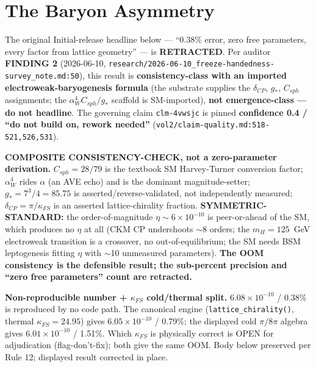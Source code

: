 \section{The Baryon Asymmetry}
\label{sec:baryon_asymmetry}

\begin{warningbox}
\footnotesize
The original Initial-release headline below --- ``0.38\% error, zero free
parameters, every factor from lattice geometry'' --- is \textbf{RETRACTED}.
Per auditor \textbf{FINDING 2} (2026-06-10,
\texttt{research/2026-06-10\_freeze-handedness-survey\_note.md:50}), this
result is \textbf{consistency-class with an imported electroweak-baryogenesis
formula} (the substrate supplies the $\delta_{CP}$, $g_*$, $C_{sph}$
assignments; the $\alpha_W^4 C_{sph}/g_*$ scaffold is SM-imported),
\textbf{not emergence-class --- do not headline}. The governing claim
\texttt{clm-4vwsjc} is pinned \textbf{confidence 0.4 / ``do not build on,
rework needed''} (\texttt{vol2/claim-quality.md:518-521,526,531}).
\par\smallskip
\textbf{COMPOSITE CONSISTENCY-CHECK, not a zero-parameter derivation.}
$C_{sph} = 28/79$ is the textbook SM Harvey-Turner conversion factor;
$\alpha_W^4$ rides $\alpha$ (an AVE echo) and is the dominant
magnitude-setter; $g_* = 7^3/4 = 85.75$ is asserted/reverse-validated, not
independently measured; $\delta_{CP} = \pi/\kappa_{FS}$ is an asserted
lattice-chirality fraction. \textbf{SYMMETRIC-STANDARD:} the
order-of-magnitude $\eta \sim 6 \times 10^{-10}$ is peer-or-ahead of the SM,
which produces no $\eta$ at all (CKM CP undershoots $\sim$8 orders; the
$m_H = 125$~GeV electroweak transition is a crossover, no out-of-equilibrium;
the SM needs BSM leptogenesis fitting $\eta$ with $\sim$10 unmeasured
parameters). \textbf{The OOM consistency is the defensible result; the
sub-percent precision and ``zero free parameters'' count are retracted.}
\par\smallskip
\textbf{Non-reproducible number + $\kappa_{FS}$ cold/thermal split.}
$6.08 \times 10^{-10}$ / $0.38\%$ is reproduced by no code path. The canonical
engine (\texttt{lattice\_chirality()}, thermal $\kappa_{FS} = 24.95$) gives
$6.05 \times 10^{-10}$ / 0.79\%; the displayed cold $\pi/8\pi$ algebra gives
$6.01 \times 10^{-10}$ / 1.51\%. Which $\kappa_{FS}$ is physically correct is
OPEN for adjudication (flag-don't-fix); both give the same OOM. Body below
preserved per Rule 12; displayed result corrected in place.
\end{warningbox}

